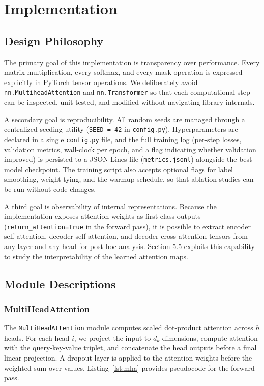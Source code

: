 \section{Implementation}

\subsection{Design Philosophy}

The primary goal of this implementation is transparency over performance. Every matrix multiplication, every softmax, and every mask operation is expressed explicitly in PyTorch tensor operations. We deliberately avoid \texttt{nn.MultiheadAttention} and \texttt{nn.Transformer} so that each computational step can be inspected, unit-tested, and modified without navigating library internals.

A secondary goal is reproducibility. All random seeds are managed through a centralized seeding utility (\texttt{SEED = 42} in \texttt{config.py}). Hyperparameters are declared in a single \texttt{config.py} file, and the full training log (per-step losses, validation metrics, wall-clock per epoch, and a flag indicating whether validation improved) is persisted to a JSON Lines file (\texttt{metrics.jsonl}) alongside the best model checkpoint. The training script also accepts optional flags for label smoothing, weight tying, and the warmup schedule, so that ablation studies can be run without code changes.

A third goal is observability of internal representations. Because the implementation exposes attention weights as first-class outputs (\texttt{return\_attention=True} in the forward pass), it is possible to extract encoder self-attention, decoder self-attention, and decoder cross-attention tensors from any layer and any head for post-hoc analysis. Section 5.5 exploits this capability to study the interpretability of the learned attention maps.

\subsection{Module Descriptions}

\subsubsection{MultiHeadAttention}

The \texttt{MultiHeadAttention} module computes scaled dot-product attention across $h$ heads. For each head $i$, we project the input to $d_k$ dimensions, compute attention with the query-key-value triplet, and concatenate the head outputs before a final linear projection. A dropout layer is applied to the attention weights before the weighted sum over values. Listing~\ref{lst:mha} provides pseudocode for the forward pass.

